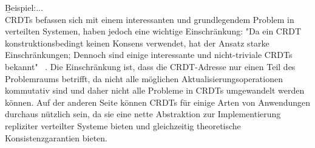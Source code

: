   \b{Beispiel:...}\\
  CRDTs befassen sich mit einem interessanten und grundlegendem Problem in verteilten Systemen, haben jedoch eine wichtige Einschränkung: "Da ein CRDT konstruktionsbedingt keinen Konsens verwendet, hat der Ansatz starke Einschränkungen; Dennoch sind einige interessante und nicht-triviale CRDTs bekannt" ~\cite{crdt_shapiro2}. Die Einschränkung ist, dass die CRDT-Adresse nur einen Teil des Problemraums betrifft, da nicht alle möglichen Aktualisierungsoperationen kommutativ sind und daher nicht alle Probleme in CRDTs umgewandelt werden können. Auf der anderen Seite können CRDTs für einige Arten von Anwendungen durchaus nützlich sein, da sie eine nette Abstraktion zur Implementierung repliziter verteilter Systeme bieten und gleichzeitig theoretische Konsistenzgarantien bieten.